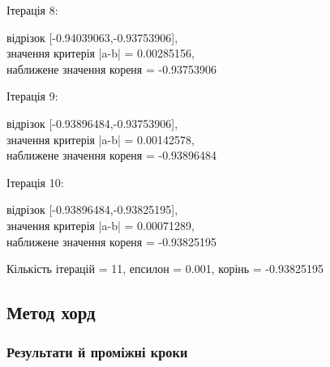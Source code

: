 \documentclass[a4paper,14pt]{extarticle} %
\begin{document}
Ітерація 8: \parbox[t]{12cm}{ відрізок [-0.94039063,-0.93753906], \\
            значення критерія |a-b| = 0.00285156, \\ 
            наближене значення кореня = -0.93753906 \\ } \par
Ітерація 9: \parbox[t]{12cm}{ відрізок [-0.93896484,-0.93753906], \\
            значення критерія |a-b| = 0.00142578, \\ 
            наближене значення кореня = -0.93896484 \\ } \par
Ітерація 10: \parbox[t]{12cm}{ відрізок [-0.93896484,-0.93825195], \\
             значення критерія |a-b| = 0.00071289, \\ 
             наближене значення кореня = -0.93825195 \\ } \par

Кількість ітерацій = 11, епсилон = 0.001, корінь = -0.93825195

\newpage
\subsection{Метод хорд}



\subsubsection*{Результати й проміжні кроки}
\end{document}
